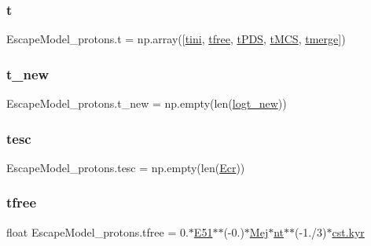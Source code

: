 \subsubsection{\texorpdfstring{t}{t}}
{\footnotesize\ttfamily Escape\+Model\+\_\+protons.\+t = np.\+array(\mbox{[}\hyperlink{namespaceEscapeModel__protons_a8adf11ae890ffc4b073e4b86548465aa}{tini}, \hyperlink{namespaceEscapeModel__protons_ab0de8bc17835b3b00d3ab940c83c199f}{tfree}, \hyperlink{namespaceEscapeModel__protons_a747211c69e34b5cc134d78483bf5a6fd}{t\+P\+DS}, \hyperlink{namespaceEscapeModel__protons_a584cb289b23163ba3fdbfac10f47442b}{t\+M\+CS}, \hyperlink{namespaceEscapeModel__protons_a2a98ed31beb0bfed830980a90c9fc265}{tmerge}\mbox{]})}

\mbox{\label{namespaceEscapeModel__protons_a24ee5cc295e7b028a62d238479dfaec3}} 
\subsubsection{\texorpdfstring{t\+\_\+new}{t\_new}}
{\footnotesize\ttfamily Escape\+Model\+\_\+protons.\+t\+\_\+new = np.\+empty(len(\hyperlink{namespaceEscapeModel__protons_a90845e96ff4889a009a9343406d1894d}{logt\+\_\+new}))}

\mbox{\label{namespaceEscapeModel__protons_ac417bc1a13424ed022c82ea44baca5ef}} 
\subsubsection{\texorpdfstring{tesc}{tesc}}
{\footnotesize\ttfamily Escape\+Model\+\_\+protons.\+tesc = np.\+empty(len(\hyperlink{namespaceEscapeModel__protons_aafc525a6b79a8214864d082302ce7676}{Ecr}))}

\mbox{\label{namespaceEscapeModel__protons_ab0de8bc17835b3b00d3ab940c83c199f}} 
\subsubsection{\texorpdfstring{tfree}{tfree}}
{\footnotesize\ttfamily float Escape\+Model\+\_\+protons.\+tfree = 0.$\ast$\hyperlink{namespaceEscapeModel__protons_af064ce6137662206b44cb8189188c577}{E51}$\ast$$\ast$(-\/0.)$\ast$\hyperlink{namespaceEscapeModel__protons_a55a313f4e7119d936467f0bf634eefec}{Mej}$\ast$\hyperlink{namespaceEscapeModel__protons_aea8f96db5e10e84cf033c2f0000e9642}{nt}$\ast$$\ast$(-\/1./3)$\ast$\hyperlink{constants_8h_a0edf155739e92555799f4a04b10af6bf}{cst.\+kyr}}

